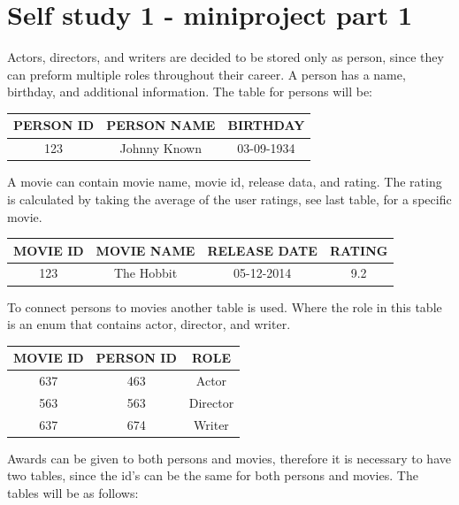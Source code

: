 \documentclass[10pt,a4paper,final]{report}
\begin{document}
\lstset{language=SQL}


\section*{Self study 1 - miniproject part 1}
Actors, directors, and writers are decided to be stored only as person, since they can preform multiple roles throughout their career. A person has a name, birthday, and additional information. The table for persons will be:

\begin{table}[H] \centering
\begin{tabular}{|c|c|c|}
\hline 
PERSON ID & PERSON NAME & BIRTHDAY \\ 
\hline 
123 & Johnny Known & 03-09-1934 \\ 
\hline 
\end{tabular} 
\end{table}

A movie can contain movie name, movie id, release data, and rating. The rating is calculated by taking the average of the user ratings, see last table, for a specific movie.

\begin{table}[H] \centering
\begin{tabular}{|c|c|c|c|}
\hline 
MOVIE ID & MOVIE NAME & RELEASE DATE & RATING\\ 
\hline 
123 & The Hobbit & 05-12-2014 & 9.2\\ 
\hline 
\end{tabular} 
\end{table}

To connect persons to movies another table is used. Where the role in this table is an enum that contains actor, director, and writer.

\begin{table}[H] \centering
\begin{tabular}{|c|c|c|}
\hline 
MOVIE ID & PERSON ID & ROLE \\ 
\hline 
637 & 463 & Actor \\ 
\hline 
563 & 563 & Director \\ 
\hline 
637 & 674 & Writer \\ 
\hline 
\end{tabular}
\end{table}

Awards can be given to both persons and movies, therefore it is necessary to have two tables, since the id's can be the same for both persons and movies. The tables will be as follows:
\end{document}
